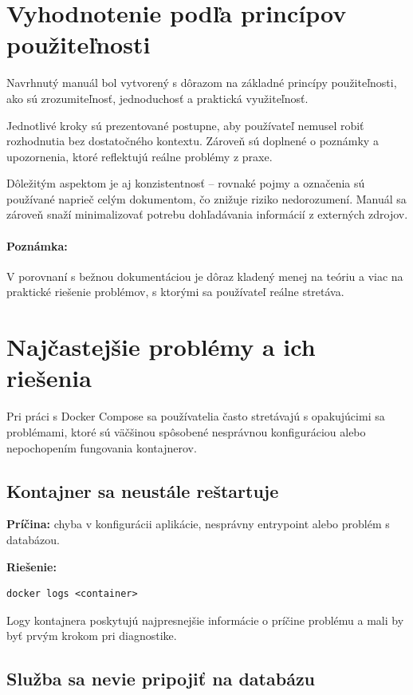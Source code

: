 \section{Vyhodnotenie podľa princípov použiteľnosti}

Navrhnutý manuál bol vytvorený s dôrazom na základné princípy použiteľnosti, ako sú zrozumiteľnosť, jednoduchosť a praktická využiteľnosť.

Jednotlivé kroky sú prezentované postupne, aby používateľ nemusel robiť rozhodnutia bez dostatočného kontextu. 
Zároveň sú doplnené o poznámky a upozornenia, ktoré reflektujú reálne problémy z praxe.

Dôležitým aspektom je aj konzistentnosť – rovnaké pojmy a označenia sú používané naprieč celým dokumentom, 
čo znižuje riziko nedorozumení. Manuál sa zároveň snaží minimalizovať potrebu dohľadávania informácií z externých zdrojov.

\paragraph{Poznámka:}
V porovnaní s bežnou dokumentáciou je dôraz kladený menej na teóriu a viac na praktické riešenie problémov, 
s ktorými sa používateľ reálne stretáva.

\clearpage

\section{Najčastejšie problémy a ich riešenia}

Pri práci s Docker Compose sa používatelia často stretávajú s opakujúcimi sa problémami, 
ktoré sú väčšinou spôsobené nesprávnou konfiguráciou alebo nepochopením fungovania kontajnerov.

\subsection{Kontajner sa neustále reštartuje}

\textbf{Príčina:} chyba v konfigurácii aplikácie, nesprávny entrypoint alebo problém s databázou.

\textbf{Riešenie:}
\begin{verbatim}
docker logs <container>
\end{verbatim}

Logy kontajnera poskytujú najpresnejšie informácie o príčine problému a mali by byť prvým krokom pri diagnostike.

\subsection{Služba sa nevie pripojiť na databázu}

